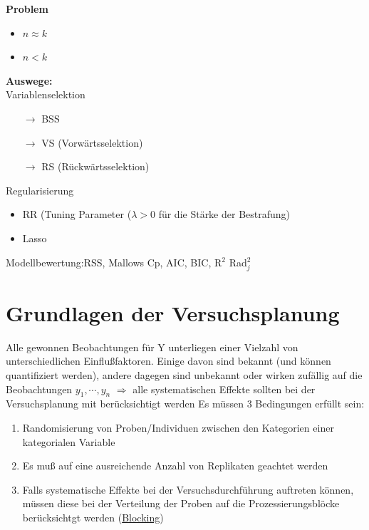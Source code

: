 \documentclass[10pt]{report}
\theoremstyle{definition}
\begin{document}
\textbf{Problem}
\begin{itemize}
	\item \(n \approx k\)
	\item \(n < k\)
\end{itemize}
\textbf{Auswege:} \\
Variablenselektion
\begin{itemize}
	\item[\(\rightarrow\)] BSS
	\item[\(\rightarrow\)] VS (Vorwärtsselektion)
	\item[\(\rightarrow\)] RS (Rückwärtsselektion)
\end{itemize}
Regularisierung
\begin{itemize}
	\item RR (Tuning Parameter (\(\lambda > 0\) für die Stärke der Bestrafung)
	\item Lasso
\end{itemize}

Modellbewertung:RSS, Mallows Cp, AIC, BIC, R$^2$ Rad$_j^2$




\chapter{Grundlagen der Versuchsplanung}
Alle gewonnen Beobachtungen für Y unterliegen einer Vielzahl von unterschiedlichen Einflußfaktoren. Einige davon sind bekannt (und können quantifiziert werden), andere dagegen sind unbekannt oder wirken zufällig auf die Beobachtungen $y_1,\cdots,y_n$
$\Rightarrow$ alle systematischen Effekte sollten bei der Versuchsplanung mit berücksichtigt werden 
Es müssen 3 Bedingungen erfüllt sein:
\begin{enumerate}
	\item Randomisierung von Proben/Individuen zwischen den Kategorien einer kategorialen Variable
	\item Es muß auf eine ausreichende Anzahl von Replikaten geachtet werden
	\item Falls systematische Effekte bei der Versuchsdurchführung auftreten können, müssen diese bei der Verteilung der Proben auf die Prozessierungsblöcke berücksichtgt werden (\underline{Blocking})
\end{enumerate}
\end{document}
